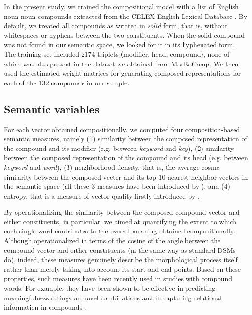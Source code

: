 \documentclass[output=paper]{langsci/langscibook}
\begin{document}
In the present study, we trained the compositional model with a list of English noun-noun compounds extracted from the CELEX English Lexical Database \citep{celex}. By default, we treated all compounds as written in \emph{solid} form, that is, without whitespaces or hyphens between the two constituents. When the solid compound was not found in our semantic space, we looked for it in its hyphenated form. The training set included 2174 triplets ⟨modifier, head, compound⟩, none of which was also present in the dataset we obtained from MorBoComp. We then used the estimated weight matrices for generating composed representations for each of the 132 compounds in our sample.


\subsection{Semantic variables}\largerpage

For each vector obtained compositionally, we computed four composition-based semantic measures, namely (1) similarity between the composed representation of the compound and its modifier (e.g. between \emph{keyword} and \emph{key}), (2) similarity between the composed representation of the compound and its head (e.g. between \emph{keyword} and \emph{word}), (3) neighborhood density, that is, the average cosine similarity between the composed vector and its top-10 nearest neighbor vectors in the semantic space (all these 3 measures have been introduced by \citealt{vecchi2011}), and (4) entropy, that is a measure of vector quality firstly introduced by \cite{lazaridoufish}.

By operationalizing the similarity between the composed compound vector and either constituents, in particular, we aimed at quantifying the extent to which each single word contributes to the overall meaning obtained compositionally. Although operationalized in terms of the cosine of the angle between the compound vector and either constituents (in the same way as standard DSMs do), indeed, these measures genuinely describe the morphological process itself rather than merely taking into account its start and end points. Based on these properties, such measures have been recently used in studies with compound words. For example, they have been shown to be effective in predicting meaningfulness ratings on novel combinations \citep{gunther2016} and in capturing relational information in compounds \citep{marelli2017}.

\end{document}
